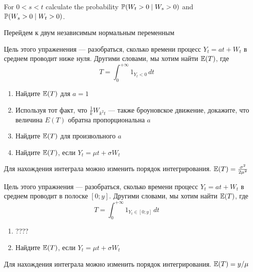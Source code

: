 \begin{problem}
For $0<s<t$ calculate the probability $\P(W_t>0 \mid W_s>0)$ and $\P(W_s>0 \mid W_t>0)$.

\begin{sol}
Перейдем к двум независимым нормальным переменным
\end{sol}
\end{problem}

\begin{problem}
Цель этого упраженения — разобраться, сколько времени процесс $Y_t=at+W_t$ в среднем проводит ниже нуля. Другими словами, мы хотим найти $\E(T)$, где
\begin{equation}
T=\int_0^{+\infty} 1_{Y_t<0}\, dt
\end{equation}

\begin{enumerate}
\item Найдите $\E(T)$ для $a=1$
\item Используя тот факт, что $\frac{1}{k}W_{k^2t}$ — также броуновское движение, докажите, что величина $E(T)$ обратна пропорциональна $a$
\item Найдите $\E(T)$ для произвольного $a$
\item Найдите $\E(T)$, если $Y_t=\mu t+\sigma W_t$
\end{enumerate}

\begin{sol}
Для нахождения интеграла можно изменить порядок интегрирования. $\E(T)=\frac{\sigma^2}{2\mu^2}$
\end{sol}
\end{problem}

\begin{problem}
Цель этого упражнения — разобраться, сколько времени процесс $Y_t=at+W_t$ в среднем проводит в полоске $[0;y]$. Другими словами, мы хотим найти $\E(T)$, где
\begin{equation}
T=\int_0^{+\infty} 1_{Y_t\in [0;y]}\, dt
\end{equation}

\begin{enumerate}
\item ????
\item Найдите $\E(T)$, если $Y_t=\mu t+\sigma W_t$
\end{enumerate}

\begin{sol}
Для нахождения интеграла можно изменить порядок интегрирования. $\E(T)=y/\mu$
\end{sol}
\end{problem}

